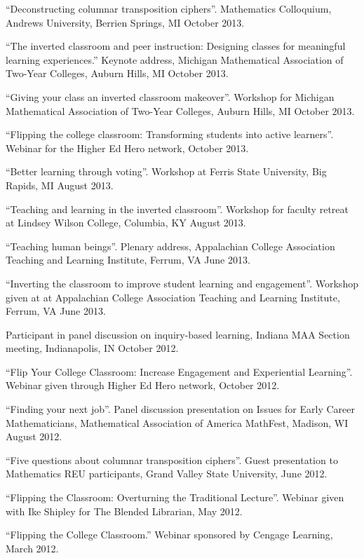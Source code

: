 \documentclass[letterpaper]{article}
\renewenvironment{itemize}{
  \begin{list}{}{
    \setlength{\leftmargin}{1.5em}
	\setlength{\itemsep}{0in}
  }
}{
  \end{list}
}
\begin{document}
\begin{itemize}
	\item ``Deconstructing columnar transposition ciphers''. Mathematics Colloquium, Andrews University, Berrien Springs, MI October 2013.
	\item ``The inverted classroom and peer instruction: Designing classes for meaningful learning experiences.'' Keynote address, Michigan Mathematical Association of Two-Year Colleges, Auburn Hills, MI October 2013.
	\item ``Giving your class an inverted classroom makeover''. Workshop for Michigan Mathematical Association of Two-Year Colleges, Auburn Hills, MI October 2013.
	\item ``Flipping the college classroom: Transforming students into active learners''. Webinar for the Higher Ed Hero network, October 2013.
	\item ``Better learning through voting''. Workshop at Ferris State University, Big Rapids, MI August 2013.
	\item ``Teaching and learning in the inverted classroom''. Workshop for faculty retreat at Lindsey Wilson College, Columbia, KY August 2013.
	\item ``Teaching human beings''. Plenary address, Appalachian College Association Teaching and Learning Institute, Ferrum, VA June 2013.
	\item ``Inverting the classroom to improve student learning and engagement''. Workshop given at at Appalachian College Association Teaching and Learning Institute, Ferrum, VA June 2013.
	\item Participant in panel discussion on inquiry-based learning, Indiana MAA Section meeting, Indianapolis, IN October 2012.
	\item ``Flip Your College Classroom: Increase Engagement and Experiential Learning''. Webinar given through Higher Ed Hero network, October 2012.
	\item ``Finding your next job''. Panel discussion presentation on Issues for Early Career Mathematicians, Mathematical Association of America MathFest, Madison, WI August 2012.
	\item ``Five questions about columnar transposition ciphers''. Guest presentation to Mathematics REU participants, Grand Valley State University, June 2012.
	\item ``Flipping the Classroom: Overturning the Traditional Lecture''. Webinar given with Ike Shipley for The Blended Librarian, May 2012.
	\item ``Flipping the College Classroom.'' Webinar sponsored by Cengage Learning, March 2012.

\end{itemize}
\end{document}
